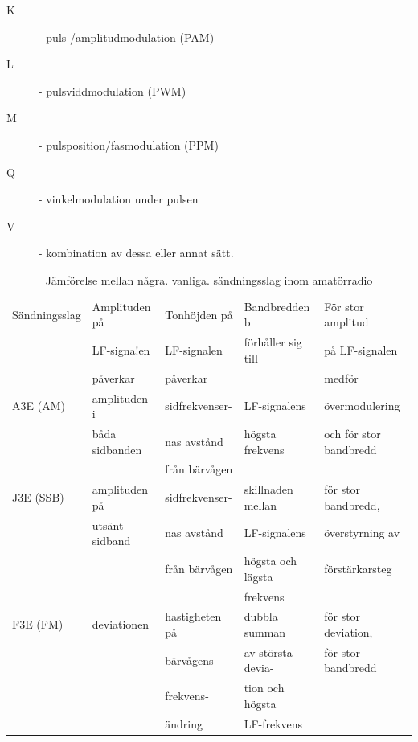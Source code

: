 \begin{description}
\item[K] - puls-/amplitudmodulation (PAM)
\item[L] - pulsviddmodulation (PWM)
\item[M] - pulsposition/fasmodulation (PPM)
\item[Q] - vinkelmodulation under pulsen
\item[V] - kombination av dessa eller annat sätt.
\end{description}

\begin{table}[h]
\begin{center}
\begin{tabular}{|l|l|l|l|l|}
\hline
Sändningsslag & Amplituden på & Tonhöjden på & Bandbredden b      & För stor amplitud \\
              & LF-signa!en   & LF-signalen  & förhåller sig till & på LF-signalen \\
              & påverkar      & påverkar     &                    & medför \\ \hline
A3E (AM) & amplituden i   & sidfrekvenser- & LF-signalens    & övermodulering \\
         & båda sidbanden & nas avstånd    & högsta frekvens & och för stor bandbredd \\
         &                & från bärvågen  & & \\
J3E (SSB)& amplituden på  & sidfrekvenser- & skillnaden mellan & för stor bandbredd,\\
         & utsänt sidband & nas avstånd    & LF-signalens      & överstyrning av\\
         &                & från bärvågen  & högsta och lägsta & förstärkarsteg\\
         &                &                & frekvens          & \\
F3E (FM) & deviationen    & hastigheten på & dubbla summan     & för stor deviation,\\
         &                & bärvågens      & av största devia- & för stor bandbredd\\
         &                & frekvens-      & tion och högsta   & \\
         &                & ändring        & LF-frekvens       & \\ \hline
\end{tabular}
\end{center}
\caption{Jämförelse mellan några. vanliga. sändningsslag inom amatörradio}
\end{table}
